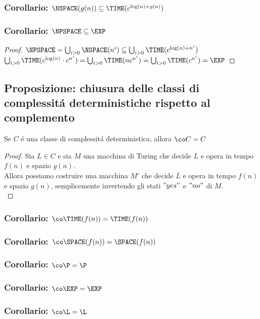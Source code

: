 \subsubsection{Corollario: $\NSPACE(g(n)) \subseteq \TIME(c^{\log(n) + g(n)})$}
\subsubsection{Corollario: $\NPSPACE \subseteq \EXP$}
\begin{proof}
$
\NPSPACE = \bigcup_{i>0} \NSPACE(n^i) \subseteq \bigcup_{i>0} \TIME(c^{\log(n) + n^i})$ \\
$\bigcup_{i>0} \TIME(c^{\log(n)} \cdot c^{n^i}) = \bigcup_{i>0} \TIME(n c^{n^i}) = \bigcup_{i>0} \TIME(c^{n^i}) = \EXP
$
\end{proof}

\subsection{Proposizione: chiusura delle classi di complessitá deterministiche rispetto al complemento}
Se $C$ é una classe di complessitá deterministica, allora $\co C = C$
\begin{proof}
Sia $L \in C$ e sia $M$ una macchina di Turing che decide $L$ e opera in tempo $f(n)$ e spazio $g(n)$. \\
Allora possiamo costruire una macchina $M'$ che decide $\overline{L}$ e opera in tempo $f(n)$ e spazio $g(n)$, semplicemente invertendo gli stati $"yes"$ e $"no"$  di $M$. \\
\end{proof}
\subsubsection{Corollario: $\co \TIME(f(n)) = \TIME(f(n))$}
\subsubsection{Corollario: $\co \SPACE(f(n)) = \SPACE(f(n))$}
\subsubsection{Corollario: $\co \P = \P$}
\subsubsection{Corollario: $\co \EXP = \EXP$}
\subsubsection{Corollario: $\co \L = \L$}
